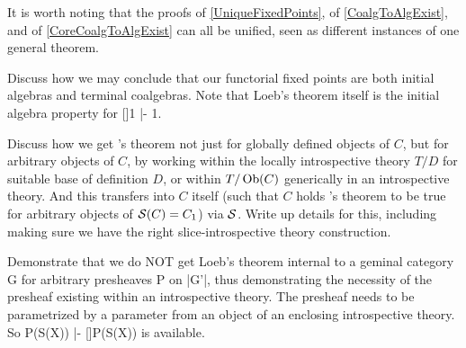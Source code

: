 
It is worth noting that the proofs of \cref{UniqueFixedPoints}, of \cref{CoalgToAlgExist}, and of \cref{CoreCoalgToAlgExist} can all be unified, seen as different instances of one general theorem. 

\begin{TODOblock}
Discuss how we may conclude that our functorial fixed points are both initial algebras and terminal coalgebras. Note that Loeb's theorem itself is the initial algebra property for []1 |- 1.
\end{TODOblock}

\begin{TODOblock}
Discuss how we get \Loeb's theorem not just for globally defined objects of $C$, but for arbitrary objects of $C$, by working within the locally introspective theory $T/D$ for suitable base of definition $D$, or within $T/\operatorname{Ob}(C)$ generically in an introspective theory. And this transfers into $C$ itself (such that $C$ holds \Loeb's theorem to be true for arbitrary objects of $\mathcal{S}(C) = C_1$) via $\mathcal{S}$. Write up details for this, including making sure we have the right slice-introspective theory construction.
\end{TODOblock}

\begin{TODOblock}
Demonstrate that we do NOT get Loeb's theorem internal to a geminal category G for arbitrary presheaves P on |G'|, thus demonstrating the necessity of the presheaf existing within an introspective theory. The presheaf needs to be parametrized by a parameter from an object of an enclosing introspective theory. So P(S(X)) |- []P(S(X)) is available.
\end{TODOblock}